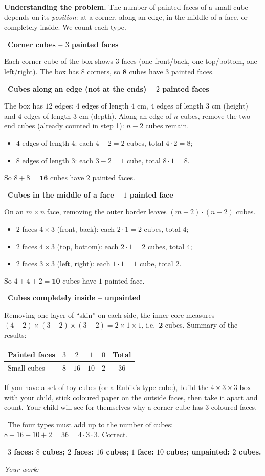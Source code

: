 \documentclass[11pt]{article}
\newif\ifsol \solfalse
\providecommand{\AnsWord}{Đáp số}
\newcommand{\StuProb}[2]{\begin{probboxS}{#1}{#2}\StuProbBody\end{probboxS}}
\newcommand{\ans}[1]{\par\smallskip{\bfseries\color{tmGreen!88!black}\AnsWord:}\ {\bfseries\color{AnsRed}#1}\par}
\newcommand{\probsol}[1]{%
  \begin{lrbox}{\solmeasure}\begin{minipage}{\dimexpr\linewidth-24pt\relax}#1\end{minipage}\end{lrbox}%
  \ifsol
    \begin{solbox}#1\end{solbox}%
  \else
    \setlength{\solht}{\dimexpr\ht\solmeasure+\dp\solmeasure+0.85cm\relax}%
    \ifdim\solht<1.35cm\setlength{\solht}{1.35cm}\fi
    \ifdim\solht>\StudentMaxWork\setlength{\solht}{\StudentMaxWork}\fi
    \par\noindent\begin{minipage}{\linewidth}%
    \expandafter\StuProb\StuProbArgs
    \begin{tcolorbox}[colback=white,colframe=Line,boxrule=0.8pt,arc=5pt,
      left=8pt,right=8pt,top=4pt,bottom=4pt,height=\solht]{\footnotesize\color{Slate}\itshape\WorkWord}\end{tcolorbox}%
    \end{minipage}\par\medskip
  \fi}
\newlength{\StudentMaxWork}\setlength{\StudentMaxWork}{4.5cm}
\newcommand{\step}[2]{\par\smallskip\noindent{\bfseries\color{tmBlue!85!black}\StepWord~#1.}\ {\bfseries #2}\par\nopagebreak}
\newcommand{\verify}[1]{\par\smallskip\noindent{\bfseries\color{tmGreen!80!black}\faCheckCircle\ \CheckWord}\ #1\par}
\def\WorkWord{Your work:}
\def\AnsWord{Answer}
\def\StepWord{Step}
\def\CheckWord{Check:}
\begin{document}
\probsol{
\textbf{Understanding the problem.} The number of painted faces of a small cube depends on its \emph{position}: at a corner, along an edge, in the middle of a face, or completely inside. We count each type.
\step{1}{Corner cubes -- $3$ painted faces}
Each corner cube of the box shows $3$ faces (one front/back, one top/bottom, one left/right). The box has $8$ corners, so $\mathbf{8}$ cubes have $3$ painted faces.

\step{2}{Cubes along an edge (not at the ends) -- $2$ painted faces}
The box has $12$ edges: $4$ edges of length $4$ cm, $4$ edges of length $3$ cm (height) and $4$ edges of length $3$ cm (depth). Along an edge of $n$ cubes, remove the two end cubes (already counted in step 1): $n-2$ cubes remain.
\begin{itemize}[leftmargin=1.3em,itemsep=0pt,topsep=0pt]
  \item $4$ edges of length $4$: each $4-2=2$ cubes, total $4\cdot2=8$;
  \item $8$ edges of length $3$: each $3-2=1$ cube, total $8\cdot1=8$.
\end{itemize}
So $8+8=\mathbf{16}$ cubes have $2$ painted faces.

\step{3}{Cubes in the middle of a face -- $1$ painted face}
On an $m\times n$ face, removing the outer border leaves $(m-2)\cdot(n-2)$ cubes.
\begin{itemize}[leftmargin=1.3em,itemsep=0pt,topsep=0pt]
  \item $2$ faces $4\times3$ (front, back): each $2\cdot1=2$ cubes, total $4$;
  \item $2$ faces $4\times3$ (top, bottom): each $2\cdot1=2$ cubes, total $4$;
  \item $2$ faces $3\times3$ (left, right): each $1\cdot1=1$ cube, total $2$.
\end{itemize}
So $4+4+2=\mathbf{10}$ cubes have $1$ painted face.

\step{4}{Cubes completely inside -- unpainted}
Removing one layer of ``skin'' on each side, the inner core measures $(4-2)\times(3-2)\times(3-2)=2\times1\times1$, i.e.\ $\mathbf{2}$ cubes.
Summary of the results:
\begin{center}\begin{tabular}{|l|c|c|c|c|c|}\hline
Painted faces & $3$ & $2$ & $1$ & $0$ & Total\\\hline
Small cubes & $8$ & $16$ & $10$ & $2$ & $36$\\\hline
\end{tabular}\end{center}
\begin{parentbox}If you have a set of toy cubes (or a Rubik's-type cube), build the $4\times3\times3$ box with your child, stick coloured paper on the outside faces, then take it apart and count. Your child will see for themselves why a corner cube has $3$ coloured faces.\end{parentbox}
\verify{The four types must add up to the number of cubes: $8+16+10+2=36=4\cdot3\cdot3$. Correct.}
\ans{$3$ faces: $8$ cubes; $2$ faces: $16$ cubes; $1$ face: $10$ cubes; unpainted: $2$ cubes.}
}
\end{document}
